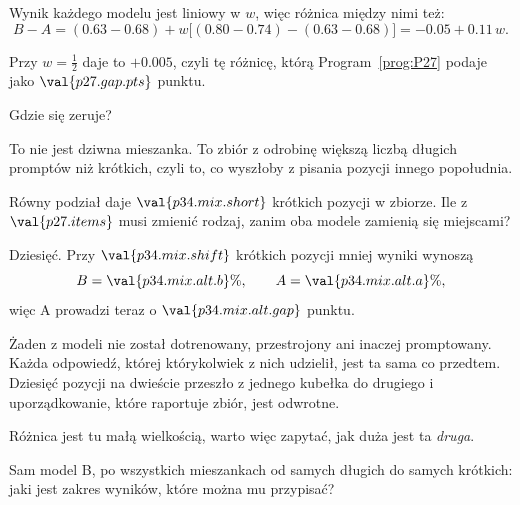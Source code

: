 \begin{fr}

Wynik każdego modelu jest liniowy w $w$, więc różnica między nimi też:
\[ B - A = (\num{0.63} - \num{0.68}) + w\bigl[(\num{0.80}-\num{0.74}) -
   (\num{0.63}-\num{0.68})\bigr] = -\num{0.05} + \num{0.11}\,w . \]

Przy $w = \frac{1}{2}$ daje to $+\num{0.005}$, czyli tę różnicę, którą
Program~\ref{prog:P27} podaje jako $\val{p27.gap.pts}$ punktu.

Gdzie się zeruje?
\dotline
\nextframe
\end{fr}

\begin{fr}

To nie jest dziwna mieszanka. To zbiór z odrobinę większą liczbą długich
promptów niż krótkich, czyli to, co wyszłoby z pisania pozycji innego
popołudnia.

Równy podział daje $\val{p34.mix.short}$ krótkich pozycji w zbiorze. Ile z
$\val{p27.items}$ musi zmienić rodzaj, zanim oba modele zamienią się
miejscami?
\dotline
\nextframe
\end{fr}

\begin{fr}
\begin{ansblock}
Dziesięć. Przy $\val{p34.mix.shift}$ krótkich pozycji mniej wyniki wynoszą
\[ B = \val{p34.mix.alt.b}\% , \qquad A = \val{p34.mix.alt.a}\% , \]
więc A prowadzi teraz o $\val{p34.mix.alt.gap}$ punktu.
\end{ansblock}

Żaden z modeli nie został dotrenowany, przestrojony ani inaczej
promptowany. Każda odpowiedź, której którykolwiek z nich udzielił, jest ta
sama co przedtem. Dziesięć pozycji na dwieście przeszło z jednego kubełka do
drugiego i uporządkowanie, które raportuje zbiór, jest odwrotne.

\end{fr}

\begin{fr}
Różnica jest tu małą wielkością, warto więc zapytać, jak duża jest ta
\emph{druga}.

Sam model B, po wszystkich mieszankach od samych długich do samych krótkich:
jaki jest zakres wyników, które można mu przypisać?
\dotline
\nextframe
\end{fr}

